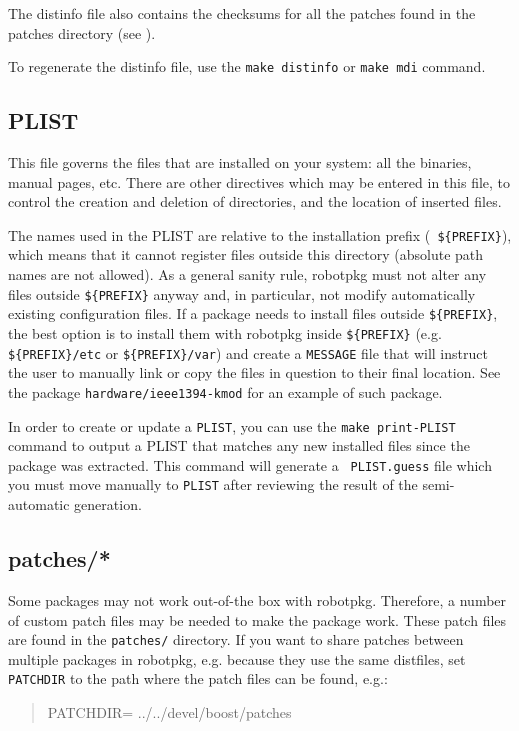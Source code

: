 The distinfo file also contains the checksums for all the patches found in the
patches directory (see
).

To regenerate the distinfo file, use the {\tt make distinfo} or {\tt make mdi}
command.


\subsection{PLIST}
\label{subsection:PLIST}

This  file  governs the  files  that  are installed  on  your  system: all  the
binaries, manual pages, etc. There are other directives which may be entered in
this  file,  to control  the  creation and  deletion  of  directories, and  the
location of inserted files.

The  names used  in the  PLIST are  relative to  the installation  prefix ({\tt
\$\{PREFIX\}}),  which  means  that  it  cannot  register  files  outside  this
directory  (absolute path names  are not  allowed). As  a general  sanity rule,
robotpkg must  not alter  any files outside  {\tt \$\{PREFIX\}} anyway  and, in
particular, not modify automatically existing configuration files. If a package
needs  to install  files  outside {\tt  \$\{PREFIX\}},  the best  option is  to
install   them   with   robotpkg   inside  {\tt   \$\{PREFIX\}}   (e.g.    {\tt
\$\{PREFIX\}/etc} or  {\tt \$\{PREFIX\}/var}) and  create a {\tt  MESSAGE} file
that will instruct the  user to manually link or copy the  files in question to
their final location. See the package {\tt hardware/ieee1394-kmod} for an
example of such package.

In  order to  create  or  update a  {\tt  PLIST}, you  can  use  the {\tt  make
print-PLIST} command  to output  a PLIST that  matches any new  installed files
since  the  package   was  extracted.   This  command  will   generate  a  {\tt
PLIST.guess} file which  you must move manually to  {\tt PLIST} after reviewing
the result of the semi-automatic generation.


\subsection{patches/*} %
\label{subsection:patches}

Some packages may not work out-of-the box with robotpkg. Therefore, a number of
custom patch  files may be needed to  make the package work.  These patch files
are found in the {\tt patches/} directory. If you want to share patches between
multiple packages  in robotpkg, e.g. because  they use the  same distfiles, set
{\tt PATCHDIR} to the path where the patch files can be found, e.g.:
\begin{quote}
   PATCHDIR= ../../devel/boost/patches
\end{quote}

